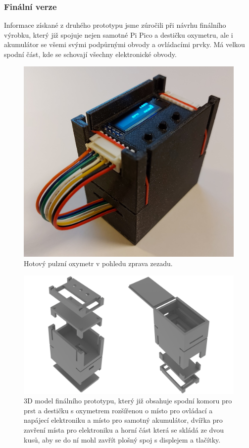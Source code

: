 \subsubsection {Finální verze}
Informace získané z druhého prototypu jsme zúročili při návrhu finálního výrobku, který již spojuje nejen samotné Pi Pico a destičku oxymetru, ale i akumulátor se všemi svými podpůrnými obvody a ovládacími prvky. Má velkou spodní část, kde se schovají všechny elektronické obvody.
\begin{figure}[ht]
  \includegraphics[scale=0.12, center]{Kapitoly/Prakticka/Obrazky/Finální_prototyp.jpg}
  \caption [Finální prototyp]{Hotový pulzní oxymetr v pohledu zprava zezadu.}
  \label{fig:Finální_prototyp}
\end{figure}
\begin{figure}[ht]
  \includegraphics[scale=0.13, center]{Kapitoly/Prakticka/Obrazky/Finální.png}
  \caption [3D model finálního prototypu]{3D model finálního prototypu, který již obsahuje spodní komoru pro prst a destičku s oxymetrem rozšířenou o místo pro ovládací a napájecí elektroniku a místo pro samotný akumulátor, dvířka pro zavření místa pro elektroniku a horní část která se skládá ze dvou kusů, aby se do ní mohl zavřít plošný spoj s displejem a tlačítky.}
  \label{fig:3D_model_finálního_prototypu}
\end{figure}
